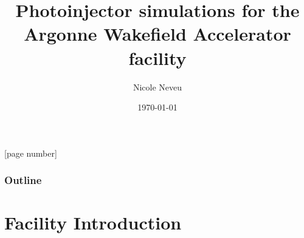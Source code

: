 \documentclass{beamer}
\title[PSI Talk]{Photoinjector simulations for the Argonne Wakefield Accelerator facility}
\author[Speaker]{Nicole Neveu}
\subtitle{}
\institute[ANL/IIT]{Argonne National Laboratory\\Illinois Institute of Technology}
\date{\today}
\begin{document}
[page number]{}
{
	\frame{\titlepage}
}

	
\begin{frame}
  \frametitle{Outline}
  \tableofcontents
\end{frame}
\section{Facility Introduction}
\end{document}
